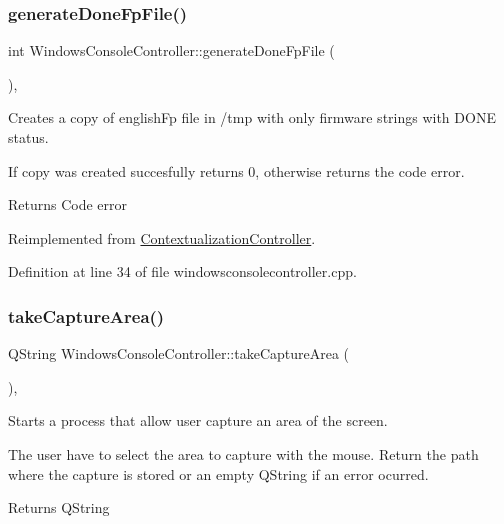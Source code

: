 \subsubsection{\texorpdfstring{generate\+Done\+Fp\+File()}{generateDoneFpFile()}}
{\footnotesize\ttfamily int Windows\+Console\+Controller\+::generate\+Done\+Fp\+File (\begin{DoxyParamCaption}{ }\end{DoxyParamCaption})\hspace{0.3cm}{\ttfamily [override]}, {\ttfamily [virtual]}}



Creates a copy of english\+Fp file in /tmp with only firmware strings with D\+O\+NE status. 

If copy was created succesfully returns 0, otherwise returns the code error. \begin{DoxyReturn}{Returns}
Code error 
\end{DoxyReturn}


Reimplemented from \mbox{\hyperlink{classContextualizationController_af142a8bbd561278c3423ccad3b40c910}{Contextualization\+Controller}}.



Definition at line 34 of file windowsconsolecontroller.\+cpp.

\mbox{\label{classWindowsConsoleController_ab536d94896c62a1920a6dbfd4b83c18b}} 
\subsubsection{\texorpdfstring{take\+Capture\+Area()}{takeCaptureArea()}}
{\footnotesize\ttfamily Q\+String Windows\+Console\+Controller\+::take\+Capture\+Area (\begin{DoxyParamCaption}{ }\end{DoxyParamCaption})\hspace{0.3cm}{\ttfamily [override]}, {\ttfamily [virtual]}}



Starts a process that allow user capture an area of the screen. 

The user have to select the area to capture with the mouse. Return the path where the capture is stored or an empty Q\+String if an error ocurred. \begin{DoxyReturn}{Returns}
Q\+String 
\end{DoxyReturn}


